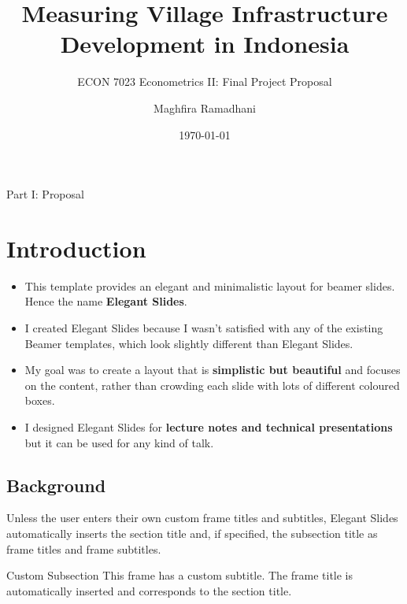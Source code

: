 \documentclass[
11pt,notheorems,hyperref={pdfauthor=whatever}
]{beamer}
\title[
]{Measuring Village Infrastructure Development in Indonesia}
\subtitle{ECON 7023 Econometrics II: Final Project Proposal}
\author[
]{
    Maghfira Ramadhani 
}
\institute{
    School of Economics, \\
    Georgia Institute of Technology}
\date{\today}
\begin{document}
{
\begin{frame}
  \titlepage
\end{frame}
}
\addtocounter{framenumber}{-1}

\begin{frame}{Part I: Proposal}
    \tableofcontents[part=1]
\end{frame}


\section{Introduction}
\begin{frame}
\begin{itemize}
    \item This template \citeauthor{example_2022} provides an elegant and minimalistic layout for beamer slides. Hence the name \alert{\textbf{Elegant Slides}}.
    \item I created Elegant Slides because I wasn't satisfied with any of the existing Beamer templates, which look slightly different than Elegant Slides.
    \item My goal was to create a layout that is \alert{\textbf{simplistic but beautiful}} and focuses on the content, rather than crowding each slide with lots of different coloured boxes.
    \item I designed Elegant Slides for \alert{\textbf{lecture notes and technical presentations}} but it can be used for any kind of talk. 
\end{itemize}
     
\end{frame}

\subsection{Background}
\begin{frame}
    Unless the user enters their own custom frame titles and subtitles, Elegant Slides automatically inserts the section title and, if specified, the subsection title as frame titles and frame subtitles.
\end{frame}

\begin{frame}{}{Custom Subsection}
    This frame has a custom subtitle. The frame title is automatically inserted and corresponds to the section title.
\end{frame}
\end{document}
